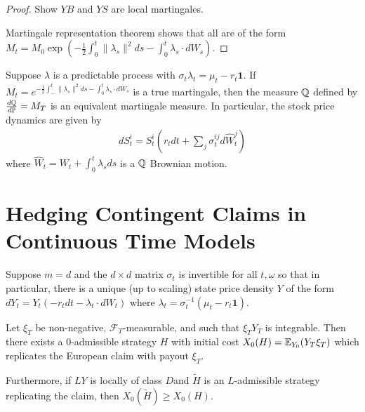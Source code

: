 \begin{proof}
  Show $YB$ and $YS$ are local martingales. 
  
  Martingale representation theorem shows that all are of the form
  $M_{t} = M_{0} \exp(-\frac{1}{2} \int_{0}^{t} \| \lambda_{s} \|^{2}
  ds - \int_{0}^{t} \lambda_{s} \cdot dW_{s})$. 
\end{proof}
\begin{thm}
  \label{sec:arbitr-theory-cont-15}
  Suppose $\lambda$ is a predictable process with $\sigma_{t}
  \lambda_{t} = \mu_{t} - r_{t} \mathbf{1}$.  If $M_{t} =
  e^{-\frac{1}{2} \int_{-}^{t} \| \lambda_{s} \|^{2}ds - \int_{0}^{t}
    \lambda_{s} \cdot dW_{s}}$ is a true martingale, then the measure
  $\Q$ defined by $\frac{d\Q}{d\Prob} = M_{T}$ is an equivalent
  martingale measure.  In particular, the stock price dynamics
  are given by
  \begin{align}
    \label{eq:6}
    dS^{i}_{t} = S^{i}_{t}(r_{t} dt + \sum_{j} \sigma^{ij}_{t} d\hat W_{t}^{j})
  \end{align} where $\hat W_{t} = W_{t} + \int_{0}^{t} \lambda_{s} ds$
  is a $\Q$ Brownian motion.
\end{thm}

\section{Hedging Contingent Claims in Continuous Time Models}
\label{sec:hedg-cont-claims}
\begin{thm}
  \label{sec:hedg-cont-claims-1}
  Suppose $m=d$ and the $d \times d$ matrix $\sigma_{t}$ is invertible
  for all $t, \omega$ so that in particular, there is a unique (up to
  scaling) state price density $Y$ of the form $dY_{t} = Y_{t}(-r_{t}
  dt - \lambda_{t} \cdot dW_{t})$ where $\lambda_{t} =
  \sigma_{t}^{-1}(\mu_{t} - r_{t} \mathbf{1})$.

  Let $\xi_{T}$ be non-negative, $\mathcal{F}_{T}$-measurable, and
  such that $\xi_{T} Y_{T}$ is integrable.  Then there exists a
  $0$-admissible strategy $H$ with initial cost $X_{0}(H) = \E{Y_{T}
    \xi_{T}}{Y_{0}}$ which replicates the European claim with payout
  $\xi_{T}$.

  Furthermore, if $LY$ is locally of class $D$and $\tilde H$ is an
  $L$-admissible strategy replicating the claim, then $X_{0}(\tilde H)
  \geq X_{0}(H)$.
\end{thm}


